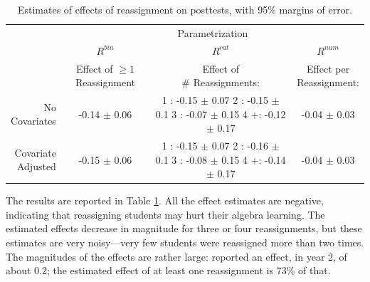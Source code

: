 \documentclass[12pt]{article}\usepackage[]{graphicx}\usepackage[]{color}
\begin{document}
\begin{table}
  \centering
\begin{tabular}{r|c|c|c|}
&\multicolumn{3}{c}{Parametrization}\\
&$R^{bin}$&$R^{cat}$&$R^{num}$\\
&\makecell[c]{Effect of\\ $\ge 1$ Reassignment}&\makecell[l]{Effect of\\  \# Reassignments:}& \makecell[c]{Effect per\\ Reassignment:}\\
\hline
\makecell[r]{No\\Covariates}&-0.14 $\pm$ 0.06 &\makecell[l]{1 :   -0.15 $\pm$ 0.07 \\2 :   -0.15 $\pm$ 0.1 \\3 :   -0.07 $\pm$ 0.15 \\4 +:  -0.12 $\pm$ 0.17 }&-0.04 $\pm$ 0.03 \\
\hline\makecell[r]{Covariate\\ Adjusted}&-0.15 $\pm$ 0.06 &\makecell[l]{1 :  -0.15 $\pm$ 0.07 \\2 :  -0.16 $\pm$ 0.1 \\3 :  -0.08 $\pm$ 0.15 \\4 +:  -0.14 $\pm$ 0.17 }&-0.04 $\pm$ 0.03 \\
\hline
\end{tabular}
\caption{Estimates of effects of reassignment on posttests, with 95\% margins of error.}
\label{effectResults}
\end{table}

The results are reported in Table \ref{effectResults}.
All the effect estimates are negative, indicating that reassigning students may hurt their algebra learning.
The estimated effects decrease in magnitude for three or four reassignments, but these estimates are very noisy---very few students were reassigned more than two times.
The magnitudes of the effects are rather large: \citet{pane2014effectiveness} reported an effect, in year 2, of about 0.2; the estimated effect of at least one reassignment is 73\% of that.
\end{document}

